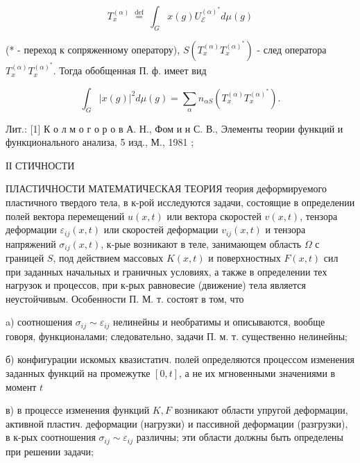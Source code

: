 \documentclass[10pt]{article}
\begin{document}
\[

T_{x}^{(\alpha)} \stackrel{\text { def }}{=} \int_{G} x(g) U_{\mathscr{E}}^{(\alpha)^{*}} d \mu(g)

\]



(* - переход к сопряженному оператору), $S\left(T_{x}^{(\alpha)} T_{x}^{(\alpha)^{*}}\right)$ - след оператора $T_{x}^{(\alpha)} T_{x}^{(\alpha)^{*}}$. Тогда обобщенная П. ф. имеет вид



\[

\int_{G}|x(g)|^{2} d \mu(g)=\sum_{\alpha} n_{\alpha S}\left(T_{x}^{(\alpha)} T_{x}^{(\alpha)^{*}}\right) .

\]



Лит.: [1] К о л м о г о р о в А. Н., Фом и н С. В., Элементы теории функций и функционального анализа, 5 изд., М., 1981 ;



ІІ СТИЧНОСТИ



ПЛАСТИЧНОСТИ МАТЕМАТИЧЕСКАЯ ТЕОРИЯ теория деформируемого пластичного твердого тела, в к-рой исследуются задачи, состоящие в определении полей вектора перемещений $u(x, t)$ или вектора скоростей $v(x, t)$, тензора деформации $\varepsilon_{i j}(x, t)$ или скоростей деформации $v_{i j}(x, t)$ и тензора напряжений $\sigma_{i j}(x, t)$, к-рые возникают в теле, занимающем область $\Omega$ с границей $S$, под действием массовых $K(x, t)$ и поверхностных $F(x, t)$ сил при заданных начальных и граничных условиях, а также в определении тех нагрузок и процессов, при к-рых равновесие (движение) тела является неустойчивым. Особенности П. М. т. состоят в том, что



a) соотношения $\sigma_{i j} \sim \varepsilon_{i j}$ нелинейны и необратимы и описываются, вообще говоря, функционалами; следовательно, задачи П. м. т. существенно нелинейны;



б) конфигурации искомых квазистатич. полей определяются процессом изменения заданных функций на промежутке $[0, t]$, а не их мгновенными значениями в момент $t$



в) в процессе изменения функций $K, F$ возникают области упругой деформации, активной пластич. деформации (нагрузки) и пассивной деформации (разгрузки), в к-рых соотношения $\sigma_{i j} \sim \varepsilon_{i j}$ различны; эти области должны быть определены при решении задачи;
\end{document}
